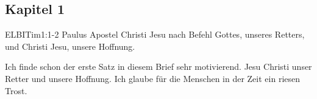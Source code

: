 \subsection{Kapitel 1}
\begin{bibeltext}{ELB}{ITim}{1:1-2}
    Paulus Apostel Christi Jesu nach Befehl Gottes, unseres Retters, und Christi Jesu, unsere Hoffnung.
\end{bibeltext}
Ich finde schon der erste Satz in diesem Brief sehr motivierend. Jesu Christi unser Retter und unsere Hoffnung. Ich glaube für die Menschen in der Zeit ein riesen Trost.